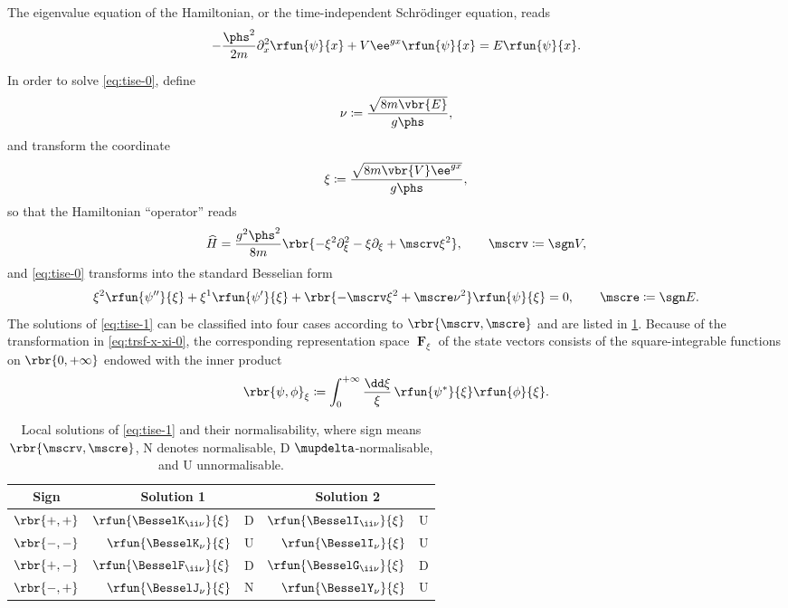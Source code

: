 \documentclass[a4paper,11pt]{article}
\begin{document}
The eigenvalue equation of the Hamiltonian, or the time-independent Schrödinger 
equation, reads
\begin{align}
-\frac{\phs^2}{2m}\partial_x^2 \rfun{\psi}{x} + V\ee^{g x} \rfun{\psi}{x} =
E \rfun{\psi}{x}.
\label{eq:tise-0}
\end{align}

In order to solve \cref{eq:tise-0}, define
\begin{align}
\nu \coloneqq \frac{\sqrt{8m\vbr{E}}}{g\phs},
\end{align}
and transform the coordinate
\begin{align}
\xi \coloneqq \frac{\sqrt{8m\vbr{V}\ee^{g x}}}{g\phs},
\label{eq:trsf-x-xi-0}
\end{align}
so that the Hamiltonian ``operator'' reads
\begin{align}
\widehat{H} = \frac{g^2\phs^2}{8m}\rbr{-\xi^2\partial_\xi^2 - \xi\partial_\xi + 
\mscrv \xi^2},\qquad \mscrv \coloneqq \sgn V,
\label{eq:hamilt-optr-1}
\end{align}
and \cref{eq:tise-0} transforms into the standard Besselian form
\begin{align}
\xi^2 \rfun{\psi''}{\xi} + \xi^1 \rfun{\psi'}{\xi} +
\rbr{-\mscrv \xi^2 + \mscre \nu^2} \rfun{\psi}{\xi} = 0,\qquad
\mscre \coloneqq \sgn E.
\label{eq:tise-1}
\end{align}
The solutions of \cref{eq:tise-1} can be classified into four cases 
according to $\rbr{\mscrv, \mscre}$ and are listed in \cref{tab:tise-1}. 
Because of the transformation in \cref{eq:trsf-x-xi-0}, the corresponding 
representation space $\mbfF_\xi$ of the state vectors \cite[ch.\ 
5.1]{Kiefer2012} consists of the square-integrable functions on $\rbr{0, 
+\infty}$ endowed with the inner product
\begin{align}
\rbr{\psi, \phi}_\xi \coloneqq \int_0^{+\infty}\frac{\dd \xi}{\xi}\,
\rfun{\psi^*}{\xi}\rfun{\phi}{\xi}.
\end{align}
\begin{table}
\begin{center}
\begin{tabular}{c||r@{, }l|r@{, }l}
\toprule
Sign & \multicolumn{2}{c|}{Solution 1} & \multicolumn{2}{c}{Solution 2} \\
\midrule
$\rbr{+,+}$ &
$\rfun{\BesselK_{\ii \nu}}{\xi}$ & D & 
$\rfun{\BesselI_{\ii \nu}}{\xi}$ & U \\
$\rbr{-,-}$ &
$\rfun{\BesselK_{\nu}}{\xi}$ & U & 
$\rfun{\BesselI_{\nu}}{\xi}$ & U \\
$\rbr{+,-}$ &
$\rfun{\BesselF_{\ii \nu}}{\xi}$ & D & 
$\rfun{\BesselG_{\ii \nu}}{\xi}$ & D \\
$\rbr{-,+}$ &
$\rfun{\BesselJ_{\nu}}{\xi}$ & N & 
$\rfun{\BesselY_{\nu}}{\xi}$ & U \\
\bottomrule
\end{tabular}
\end{center}
\caption{Local solutions of \cref{eq:tise-1} and their normalisability, where 
sign means $\rbr{\mscrv, \mscre}$, N denotes normalisable, D 
$\mupdelta$-normalisable, and U unnormalisable.
\label{tab:tise-1}}
\end{table}
\end{document}
